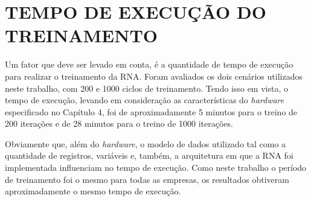 \section{TEMPO DE EXECUÇÃO DO TREINAMENTO}
Um fator que deve ser levado em conta, é a quantidade de tempo de execução para realizar o treinamento da RNA. Foram avaliados os dois cenários utilizados neste trabalho, com 200 e 1000 ciclos de treinamento. Tendo isso em vista, o tempo de execução, levando em consideração as características do \textit{hardware} especificado no Capítulo 4, foi de aproximadamente 5 minutos para o treino de 200 iterações e de 28 minutos para o treino de 1000 iterações. 

Obviamente que, além do \textit{hardware}, o modelo de dados utilizado tal como a quantidade de registros, variáveis e, também, a arquitetura em que a RNA foi implementada influenciam no tempo de execução. Como neste trabalho o período de treinamento foi o mesmo para todas as empresas, os resultados obtiveram aproximadamente o mesmo tempo de execução.